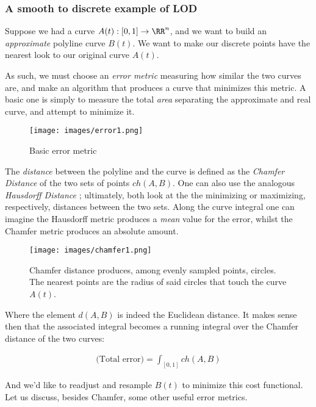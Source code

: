 \subsubsection{A smooth to discrete example of LOD}

Suppose we had a curve $A(t):[0,1] \rightarrow \RR^n$,
and we want to build an \emph{approximate} polyline curve
$B(t)$. We want to make our discrete points have the nearest
look to our original curve $A(t)$. 

\spa

As such, we must choose an \emph{error metric} measuring how
similar the two curves are, and make an algorithm that produces a
curve that minimizes this metric. A basic one is simply to measure
the total \emph{area} separating the approximate and real curve,
and attempt to minimize it.

\begin{figure}[h]
    \centering
    \texttt{[image: images/error1.png]}
    \caption{Basic error metric}
\end{figure}

\spa

The \emph{distance} between the polyline and the curve is
defined as the \emph{Chamfer Distance} \cite{chamfer1}
of the two sets of points $ch(A,B)$. One can also use the analogous
\emph{Hausdorff Distance} \cite{chamfer3}; ultimately, both
look at the the minimizing or maximizing, respectively, distances between
the two sets. Along the curve integral one can imagine the Hausdorff
metric produces a \emph{mean} value for the error, whilst the Chamfer
metric produces an absolute amount.

\begin{figure}[h]
    \centering
    \texttt{[image: images/chamfer1.png]}
    \caption{Chamfer distance produces,
    among evenly sampled points, circles.
    The nearest points are the radius of
    said circles that touch the curve $A(t)$.}
\end{figure}

Where the element $d(A,B)$ is indeed the Euclidean distance.
It makes sense then that the associated integral
becomes a running integral over the Chamfer distance
of the two curves:

\begin{align*}
    \text{(Total error)} = \int_{[0,1]} ch(A,B) 
\end{align*}

And we'd like to readjust and resample $B(t)$ to
minimize this cost functional. Let us discuss, besides Chamfer, some 
other useful error metrics.

